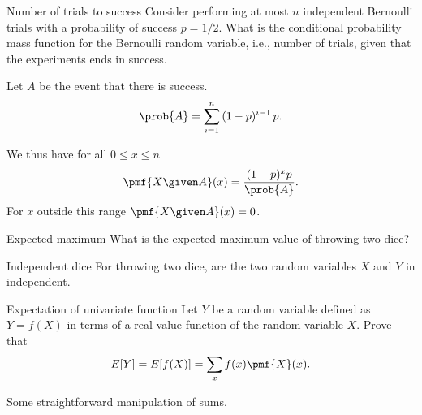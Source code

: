 \begin{probl}{Number of trials to success}
Consider performing at most $n$ independent Bernoulli trials with a
probability of success $p = 1/2$.  What is the conditional probability
mass function for the Bernoulli random variable, i.e., number of
trials, given that the experiments ends in success.  
\end{probl}
\begin{answer}
Let $A$ be the event that there is success. 
\[
\prob{A} = \sum_{i = 1}^{n}{(1-p)^{i-1}\,p}.
\]

We thus have for all $0 \le x \le n$
\[
\pmf{X \given A}(x) = \frac {(1-p)^x p}{\prob{A}}.
\]
For $x$ outside this range $\pmf{X \given A}(x) = 0$.
\end{answer}


\begin{probl}{Expected maximum}
What is the expected maximum value of throwing two dice?
\end{probl}

\begin{probl}{Independent dice}
For throwing two dice, are the two random variables $X$ and $Y$ in
 independent.
\end{probl}


\begin{probl}{Expectation of univariate function}
Let $Y$ be a random variable defined as $Y = f(X)$ in terms of a
real-value function of the random variable $X$. Prove that
\[
E[Y] = E[f(X)] = \sum_{x}{f(x) \pmf{X}(x)}.
\]
\end{probl}
\begin{answer}
Some straightforward manipulation of sums.
\end{answer}



